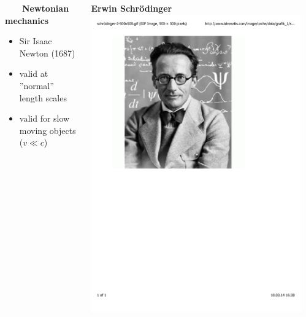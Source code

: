\documentclass[mathserif,8pt]{beamer}
\begin{document}
\begin{frame}
\begin{columns}
\begin{column}{.30\textwidth}
    \end{column}
    \begin{column}{.40\textwidth}
    \ \ \ \ \textbf{Newtonian mechanics}
    \begin{itemize}
	\item Sir Isaac Newton (1687)
	\item valid at ''normal'' length scales
	\item valid for slow moving objects ($v \ll c$)
    \end{itemize}
    \end{column}
    \begin{column}{.30\textwidth}
	\centering
	\textbf{Erwin Schr\"{o}dinger}\\
	\includegraphics[viewport = 100 400 370 800, clip, scale=0.15]{figures/schrodinger.pdf}
    \end{column}
    \end{columns}

\end{frame}
\end{document}

